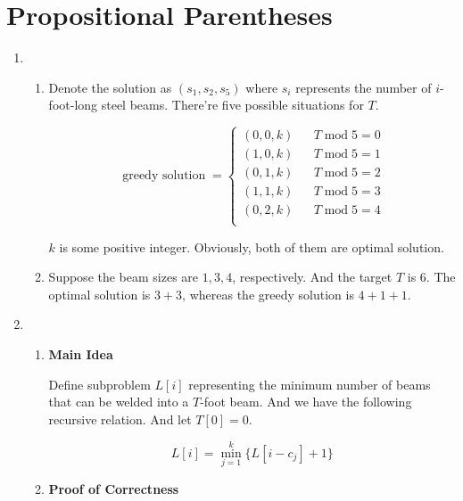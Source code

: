 \documentclass[11pt]{article}
\newenvironment{qparts}{\begin{enumerate}[{(}a{)}]}{\end{enumerate}}
\begin{document}
\section{Propositional Parentheses}
\begin{qparts}
	
	\item 
	\renewcommand{\theenumii}{\roman{enumii}}
	\begin{enumerate}
		\item 
		
		Denote the solution as $(s_1, s_2, s_5)$ where $s_i$ represents the number of $i$-foot-long steel beams.
		There're five possible situations for $T$. 
		
		\[ \operatorname{greedy \ solution}=
		\left\{
			\begin{array}{rcl}
				(0, 0, k)       &      & T \operatorname{mod} 5 = 0  \\
				(1, 0, k)       &      & T \operatorname{mod} 5 = 1  \\
				(0, 1, k)       &      & T \operatorname{mod} 5 = 2  \\
				(1, 1, k)       &      & T \operatorname{mod} 5 = 3  \\
				(0, 2, k)       &      & T \operatorname{mod} 5 = 4  \\
			\end{array}
		\right.
		\]
		
		$k$ is some positive integer. Obviously, both of them are optimal solution.

				
		\item Suppose the beam sizes are $1, 3, 4$, respectively. And the target $T$ is 6. The optimal solution is $3+3$, whereas the greedy solution is $4+ 1 + 1$.
		
		
	\end{enumerate}
	
	\item 
	
	\renewcommand{\theenumii}{\roman{enumii}}
	\begin{enumerate}
		\item \textbf{Main Idea}
		
		Define subproblem $L[i]$ representing the minimum number of beams that can be welded into a $T$-foot beam. And we have the following recursive relation. And let $T[0] = 0$.
		
		\[
			L[i] = \min_{j=1}^{k}\{L[i - c_j] + 1\}
		\]
		
		\item \textbf{Proof of Correctness}
		

\end{enumerate}
\end{qparts}
\end{document}
